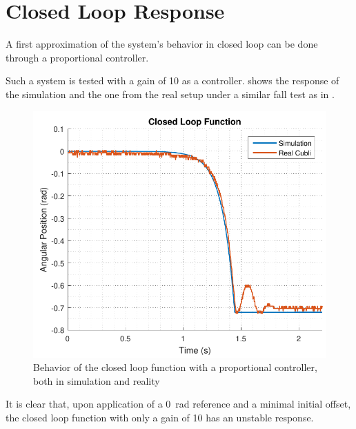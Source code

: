 \section{Closed Loop Response}\label{closedLoop}
A first approximation of the system's behavior in closed loop can be done through a proportional controller.

Such a system is tested with a gain of 10 as a controller.  shows the response of the simulation and the one from the real setup under a similar fall test as in . 

\begin{figure}[H] 
	\centering 
	\includegraphics[scale=0.6]{figures/closedLoopResponse}	
	\caption{Behavior of the closed loop function with a proportional controller, both in simulation and reality}
	\label{closedLoopResponse}
\end{figure}
%
It is clear that, upon application of a \SI{0}{rad} reference and a minimal initial offset, the closed loop function with only a gain of 10 has an unstable response.
